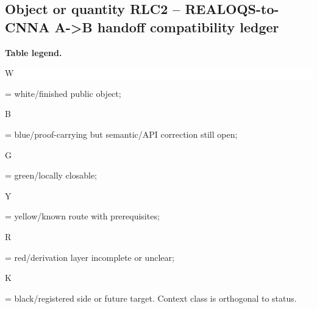 \subsection*{Object or quantity RLC2 -- REALOQS-to-CNNA A->B handoff compatibility ledger}
\hypertarget{objproof:RLC2}{}
\par\smallskip\noindent\begin{minipage}{0.99\linewidth}\footnotesize\raggedright\textbf{Table legend.} \colorbox{white}{\strut W} = white/finished public object; \colorbox{cyan!20}{\strut B} = blue/proof-carrying but semantic/API correction still open; \colorbox{green!18}{\strut G} = green/locally closable; \colorbox{yellow!25}{\strut Y} = yellow/known route with prerequisites; \colorbox{red!20}{\strut R} = red/derivation layer incomplete or unclear; \colorbox{black!18}{\strut K} = black/registered side or future target. Context class is orthogonal to status.\end{minipage}\par\vspace{0.25em}
